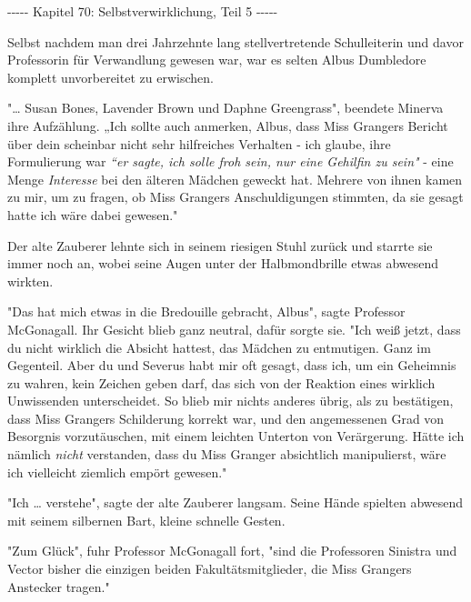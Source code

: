 

\hypertarget{selbstverwirklichung-teil-5}{%

-\/-\/-\/-\/- Kapitel 70: Selbstverwirklichung, Teil 5 -\/-\/-\/-\/-

Selbst nachdem man drei Jahrzehnte lang stellvertretende Schulleiterin und davor Professorin für Verwandlung gewesen war, war es selten Albus Dumbledore komplett unvorbereitet zu erwischen.

"… Susan Bones, Lavender Brown und Daphne Greengrass", beendete Minerva ihre Aufzählung. „Ich sollte auch anmerken, Albus, dass Miss Grangers Bericht über dein scheinbar nicht sehr hilfreiches Verhalten - ich glaube, ihre Formulierung war \emph{“er sagte, ich solle froh sein, nur eine Gehilfin zu sein"} - eine Menge \emph{Interesse} bei den älteren Mädchen geweckt hat. Mehrere von ihnen kamen zu mir, um zu fragen, ob Miss Grangers Anschuldigungen stimmten, da sie gesagt hatte ich wäre dabei gewesen."

Der alte Zauberer lehnte sich in seinem riesigen Stuhl zurück und starrte sie immer noch an, wobei seine Augen unter der Halbmondbrille etwas abwesend wirkten.

"Das hat mich etwas in die Bredouille gebracht, Albus", sagte Professor McGonagall. Ihr Gesicht blieb ganz neutral, dafür sorgte sie. "Ich weiß jetzt, dass du nicht wirklich die Absicht hattest, das Mädchen zu entmutigen. Ganz im Gegenteil. Aber du und Severus habt mir oft gesagt, dass ich, um ein Geheimnis zu wahren, kein Zeichen geben darf, das sich von der Reaktion eines wirklich Unwissenden unterscheidet. So blieb mir nichts anderes übrig, als zu bestätigen, dass Miss Grangers Schilderung korrekt war, und den angemessenen Grad von Besorgnis vorzutäuschen, mit einem leichten Unterton von Verärgerung. Hätte ich nämlich \emph{nicht} verstanden, dass du Miss Granger absichtlich manipulierst, wäre ich vielleicht ziemlich empört gewesen."

"Ich … verstehe", sagte der alte Zauberer langsam. Seine Hände spielten abwesend mit seinem silbernen Bart, kleine schnelle Gesten.

"Zum Glück", fuhr Professor McGonagall fort, "sind die Professoren Sinistra und Vector bisher die einzigen beiden Fakultätsmitglieder, die Miss Grangers Anstecker tragen."

}
